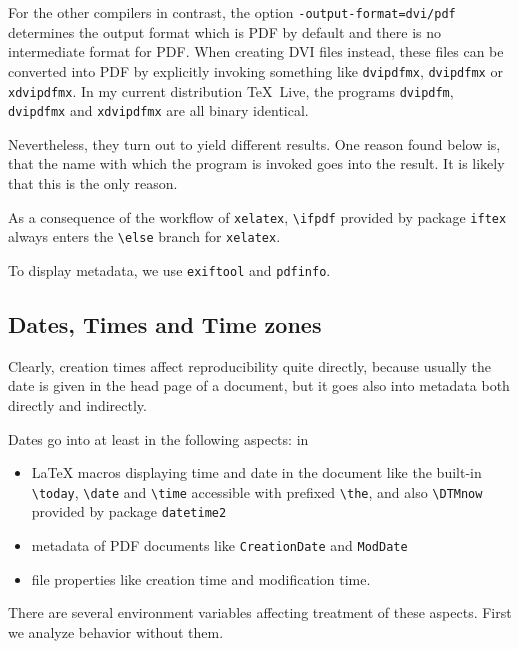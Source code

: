 \documentclass[a4paper, english]{article}%
\newcommand{\xelatex}{\texttt{xelatex}}
\newcommand{\cmd}[1]{\texttt{\textbackslash#1}}
\newcommand{\texlive}{\TeX~Live}
\begin{document}
For the other compilers in contrast, the option \texttt{-output-format=dvi/pdf} 
determines the output format which is PDF by default 
and there is no intermediate format for PDF\@. 
When creating DVI files instead, these files can be converted into PDF 
by explicitly invoking something like 
\texttt{dvipdfmx}, \texttt{dvipdfmx} or \texttt{xdvipdfmx}. 
In my current distribution \texlive, 
the programs \texttt{dvipdfm}, \texttt{dvipdfmx} and \texttt{xdvipdfmx} 
are all binary identical. 

Nevertheless, they turn out to yield different results. 
One reason found below is, 
that the name with which the program is invoked 
goes into the result. 
It is likely that this is the only reason. 

As a consequence of the workflow of \xelatex, 
\cmd{ifpdf} provided by package \texttt{iftex} 
always enters the \cmd{else} branch for \xelatex. 

To display metadata, we use \texttt{exiftool} and \texttt{pdfinfo}. 

\subsection{Dates, Times and Time zones}\label{subsec:dateTime}

Clearly, creation times affect reproducibility quite directly, 
because usually the date is given in the head page of a document, 
but it goes also into metadata both directly and indirectly. 

Dates go into at least in the following aspects: in 
%
\begin{itemize}
\item 
\LaTeX{} macros displaying time and date in the document 
like the built-in \cmd{today}, \cmd{date} and \cmd{time} 
accessible with prefixed \cmd{the}, 
and also \cmd{DTMnow} provided by package \texttt{datetime2} 
\item 
metadata of PDF documents like \texttt{CreationDate} 
and \texttt{ModDate}
\item 
file properties like creation time and modification time. 
\end{itemize}

There are several environment variables affecting treatment of these aspects. 
First we analyze behavior without them. 
\end{document}
